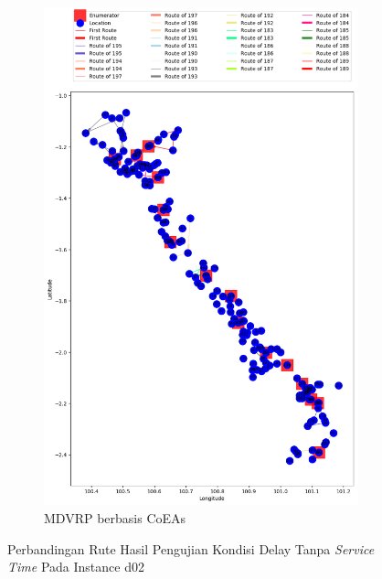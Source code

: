 \begin{figure}[H]
	\centering
	\begin{subfigure}[t]{\textwidth}
		\centering
		\includegraphics[width=\textwidth]{Resources/Images/delayed_2/real_m15_n100_delayed_2_coes}
		\caption{MDVRP berbasis CoEAs}
		\label{fig:real_m15_n100_delayed_2_coes}
	\end{subfigure}
	\caption{Perbandingan Rute Hasil Pengujian Kondisi Delay Tanpa \textit{Service Time} Pada Instance d02}
	\label{fig:real_m15_n100_delayed_2}
\end{figure}


